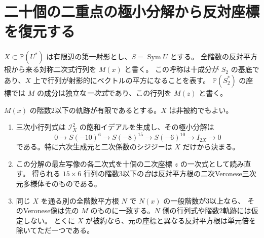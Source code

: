 \section{二十個の二重点の極小分解から反対座標を復元する}
\label{sec:double-point-opposite-reconstruction}
$X\subset\mathbb P(U^*)$ は有限辺の第一射影とし、$S=\operatorname{Sym}U$ とする。
全階数の反対平方根から来る対称二次式行列を $M(x)$ と書く。
この呼称は十成分が $S_2$ の基底であり、$X$ 上で行列が射影的にベクトルの平方になることを表す。
$\mathbb P(S_2^*)$ の座標では $M$ の成分は独立な\emph{一次式}であり、この行列を $M(z)$ と書く。
\begin{theorem}\label{thm:double-point-opposite-reconstruction}
$M(x)$ の階数2以下の軌跡が有限であるとする。$X$ は非被約でもよい。
\begin{enumerate}
\item 三次小行列式は $\mathcal I_X^2$ の飽和イデアルを生成し、その極小分解は
\[
 0\to S(-10)^6\to S(-8)^{15}\to S(-6)^{10}\to I_{2X}\to0
\]
である。特に六次生成元と二次係数のシジジーは $X$ だけから決まる。
\item この分解の最左写像の各二次式を十個の二次座標 $z$ の一次式として読み直す。
得られる $15\times6$ 行列の階数3以下の\emph{台}は反対平方根の二次Veronese三次元多様体そのものである。
\item 同じ $X$ を通る別の全階数平方根 $N$ で $N(x)$ の一般階数が3以上なら、
そのVeronese像は先の $M$ のものに一致する。$N$ 側の行列式や階数2軌跡には仮定しない。
とくに $X$ が被約なら、元の座標と異なる反対平方根は単元倍を除いてただ一つである。
\end{enumerate}
\end{theorem}
